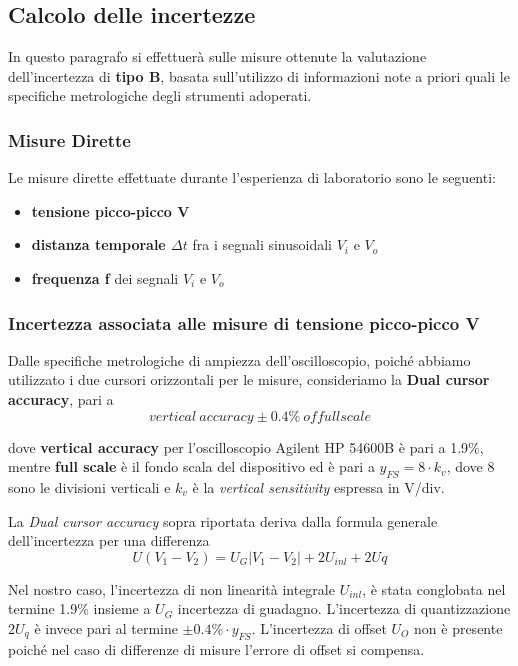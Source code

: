 \clearpage

\subsection{Calcolo delle incertezze}
In questo paragrafo si effettuerà sulle misure ottenute la valutazione dell'incertezza di \textbf{tipo B}, basata sull'utilizzo di informazioni note a priori quali le specifiche metrologiche degli strumenti adoperati.

\subsubsection{Misure Dirette}

Le misure dirette effettuate durante l'esperienza di laboratorio sono le seguenti:
\begin{itemize}
    \item \textbf{tensione picco-picco V}
    \item \textbf{distanza temporale $\Delta t$}  fra i segnali sinusoidali $V_i$ e $V_o$
    \item \textbf{frequenza f} dei segnali $V_i$ e $V_o$ 
\end{itemize}


\subsubsection*{Incertezza associata alle misure di tensione picco-picco V}

Dalle specifiche metrologiche di ampiezza dell'oscilloscopio, poiché abbiamo utilizzato i due cursori orizzontali per le misure, consideriamo la \textbf{Dual cursor accuracy}, pari a 
\[vertical \ accuracy \pm 0.4\% \ of full scale\]

dove \textbf{vertical accuracy} per l'oscilloscopio Agilent HP 54600B è pari a 1.9\%, mentre \textbf{full scale} è il fondo scala del dispositivo ed è pari a $y_{FS} = 8 \cdot k_v$, dove 8 sono le divisioni verticali e $k_v$ è la \emph{vertical sensitivity} espressa in V/div.

La \emph{Dual cursor accuracy} sopra riportata deriva dalla formula generale dell'incertezza per una differenza 
\[U(V_1 - V_2) = U_G|V_1 - V_2| + 2U_{inl} + 2U{q}\]

Nel nostro caso, l'incertezza di non linearità integrale $U_{inl}$, è stata conglobata nel termine 1.9\% insieme a $U_G$ incertezza di guadagno. L'incertezza di quantizzazione $2U_q$ è invece pari al termine $\pm 0.4\% \cdot y_{FS}$. L'incertezza di offset $U_O$ non è presente poiché nel caso di differenze di misure l'errore di offset si compensa.

